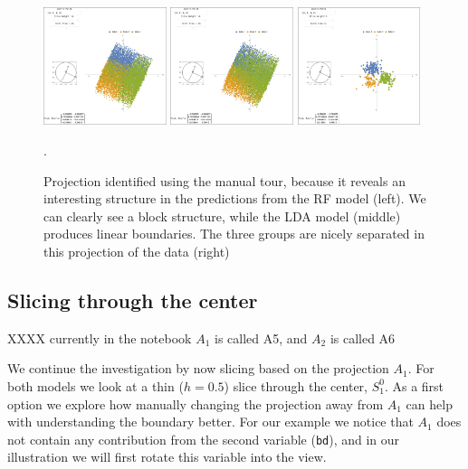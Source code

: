 \documentclass[]{interact}
\theoremstyle{plain}%
\theoremstyle{definition}
\theoremstyle{remark}
\begin{document}
\begin{figure}[ht]
\centerline{\includegraphics[width=0.32\textwidth]{figures/proj1_rf.png}
\includegraphics[width=0.32\textwidth]{figures/proj1_lda.png}
\includegraphics[width=0.32\textwidth]{figures/proj1_data.png}}
\caption{Projection identified using the manual tour, because it reveals an interesting structure in the predictions from the RF model (left). We can clearly see a block structure, while the LDA model (middle) produces linear boundaries. The three groups are nicely separated in this projection of the data (right)}.
\label{proj1}
\end{figure}

\hypertarget{slicing-through-the-center}{%
\subsection{Slicing through the
center}\label{slicing-through-the-center}}

XXXX currently in the notebook \(A_1\) is called A5, and \(A_2\) is
called A6

We continue the investigation by now slicing based on the projection
\(A_1\). For both models we look at a thin (\(h=0.5\)) slice through the
center, \(S_1^0\). As a first option we explore how manually changing
the projection away from \(A_1\) can help with understanding the
boundary better. For our example we notice that \(A_1\) does not contain
any contribution from the second variable (\texttt{bd}), and in our
illustration we will first rotate this variable into the view.
\end{document}
